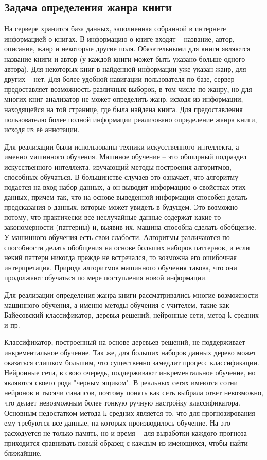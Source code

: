 \documentclass[a4paper, 12pt]{report}
\begin{document}
\subsection{Задача определения жанра книги}

На сервере хранится база данных, заполненная собранной в интернете информацией о книгах. В информацию о книге входят -- название, автор, описание, жанр и некоторые другие поля. Обязательными для книги являются название книги и автор (у каждой книги может быть указано больше одного автора). Для некоторых книг в найденной информации уже указан жанр, для других -- нет. Для более удобной навигации пользователя по базе, сервер предоставляет возможность различных выборок, в том числе по жанру, но для многих книг анализатор не может определить жанр, исходя из информации, находящейся на той странице, где была найдена книга. Для предоставления пользователю более полной информации реализовано определение жанра книги, исходя из её аннотации. 

Для реализации были использованы техники искусственного интеллекта, а именно машинного обучения. Машиное обучение -- это обширный подраздел искусственного интеллекта, изучающий методы построения алгоритмов, способных обучаться. В большинстве случаев это означает, что алгоритму подается на вход набор данных, а он выводит информацию о свойствах этих данных, причем так, что на основе выведенной информации способен делать предсказания о данных, которые может увидеть в будущем. Это возможно потому, что практически все неслучайные данные содержат какие-то закономерности (паттерны) и, выявив их, машина способна сделать обобщение. У машинного обучения есть свои слабости. Алгоритмы различаются по способности делать обобщения на основе больших наборов паттернов, и если некий паттерн никогда прежде не встречался, то возможна его ошибочная интерпретация. Природа алгоритмов машинного обучения такова, что они продолжают обучаться по мере поступления новой информации.

Для реализации определения жанра книги рассматривались многие возможности машинного обучения, а именно методы обучения с учителем, такие как Байесовский классификатор, деревья решений, нейронные сети, метод k-средних и пр. 

Классификатор, построенный на основе деревьев решений, не поддерживает инкрементальное обучение. Так же, для больших наборов данных дерево может оказаться слишком большим, что существенно замедлит процесс классификации. Нейронные сети, в свою очередь, поддерживают инкрементальное обучение, но являются своего рода "черным ящиком". В реальных сетях имеются сотни нейронов и тысячи синапсов, поэтому понять как сеть выбрала ответ невозможно, что делает невозможным более тонкую ручную настройку классификатора. Основным недостатком метода k-средних является то, что для прогнозирования ему требуются все данные, на которых производилось обучение. На это расходуется не только память, но и время -- для выработки каждого прогноза приходится сравнивать новый образец с каждым из имеющихся, чтобы найти ближайшие. 
\end{document}
